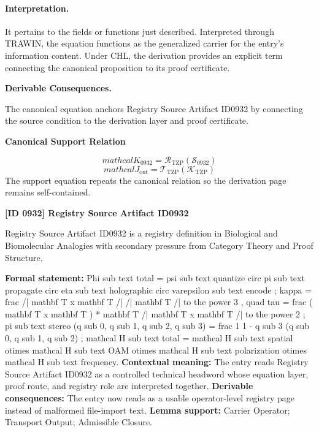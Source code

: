 \paragraph{Interpretation.}
It pertains to the fields or functions just described. Interpreted through TRAWIN, the equation functions as the generalized carrier for the entry’s information content. Under CHL, the derivation provides an explicit term connecting the canonical proposition to its proof certificate.

\par\vspace{0.35em}
\noindent\textbf{Derivable Consequences.}\quad
\begingroup
\footnotesize
\raggedright
The canonical equation anchors Registry Source Artifact ID0932 by connecting the source condition to the derivation layer and proof certificate.
\par\endgroup

\noindent\textbf{Canonical Support Relation}\par
\[
mathcal{K}_{0932}=\mathcal{R}_{\mathrm{TZP}}\!\left(\mathcal{S}_{0932}\right)
\]
\[
mathcal{J}_{\mathrm{out}} = \mathcal{T}_{\mathrm{TZP}}\!\left(\mathcal{K}_{\mathrm{TZP}}\right)
\]
\noindent The support equation repeats the canonical relation so the derivation page remains self-contained.\par

\clearpage
\noindent\textbf{[ID 0932] Registry Source Artifact ID0932}\par
\vspace{0.35em}
\begingroup\small
{}
Registry Source Artifact ID0932 is a registry definition in Biological and Biomolecular Analogies with secondary pressure from Category Theory and Proof Structure.

\begingroup\footnotesize\setlength{\emergencystretch}{3em}\sloppy
\textbf{Formal statement:} Phi sub text total = psi sub text quantize circ pi sub text propagate circ eta sub text holographic circ varepsilon sub text encode ; kappa = frac /| mathbf T x mathbf T /| /| mathbf T /| to the power 3 , quad tau = frac ( mathbf T x mathbf T ) * mathbf T /| mathbf T x mathbf T /| to the power 2 ; pi sub text stereo (q sub 0, q sub 1, q sub 2, q sub 3) = frac 1 1 - q sub 3 (q sub 0, q sub 1, q sub 2) ; mathcal H sub text total = mathcal H sub text spatial otimes mathcal H sub text OAM otimes mathcal H sub text polarization otimes mathcal H sub text frequency. \textbf{Contextual meaning:} The entry reads Registry Source Artifact ID0932 as a controlled technical headword whose equation layer, proof route, and registry role are interpreted together. \textbf{Derivable consequences:} The entry now reads as a usable operator-level registry page instead of malformed file-import text. \textbf{Lemma support:} Carrier Operator; Transport Output; Admissible Closure.\par
\endgroup

